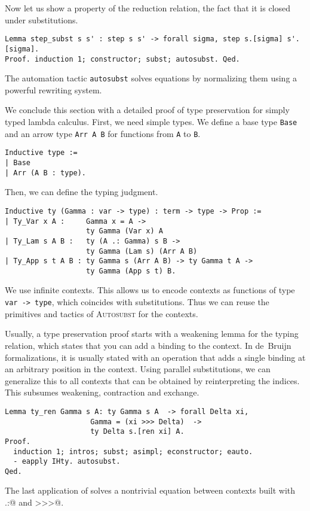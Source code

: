 \documentclass{scrartcl}
\newcommand{\Autosubst}{\textsc{Autosubst}\xspace}
\newcommand{\lst}{\lstinline}
\begin{document}
Now let us show a property of the reduction relation, the fact that it is closed under substitutions.
\begin{lstlisting}
Lemma step_subst s s' : step s s' -> forall sigma, step s.[sigma] s'.[sigma].
Proof. induction 1; constructor; subst; autosubst. Qed.
\end{lstlisting}
The automation tactic \lst$autosubst$ solves equations by normalizing them using a powerful rewriting system. 

We conclude this section with a detailed proof of type preservation for simply typed lambda calculus.
First, we need simple types. We define a base type \lst$Base$ and an arrow type \lst$Arr A B$ for functions from \lst$A$ to \lst$B$.
\begin{lstlisting}
Inductive type :=
| Base
| Arr (A B : type).
\end{lstlisting}
Then, we can define the typing judgment.
\begin{lstlisting}
Inductive ty (Gamma : var -> type) : term -> type -> Prop :=
| Ty_Var x A :     Gamma x = A -> 
                   ty Gamma (Var x) A
| Ty_Lam s A B :   ty (A .: Gamma) s B -> 
                   ty Gamma (Lam s) (Arr A B)
| Ty_App s t A B : ty Gamma s (Arr A B) -> ty Gamma t A -> 
                   ty Gamma (App s t) B.
\end{lstlisting}
We use infinite contexts. This allows us to encode contexts as functions of type \lst$var -> type$, which coincides with substitutions. Thus we can reuse the primitives and tactics of \Autosubst for the contexts.

Usually, a type preservation proof starts with a weakening lemma for the typing relation, which states that you can add a binding to the context. 
In de~Bruijn formalizations, it is usually stated with an operation that adds a single binding at an arbitrary position in the context.
Using parallel substitutions, we can generalize this to all contexts that can be obtained by reinterpreting the indices. This subsumes weakening, contraction and exchange.
\begin{lstlisting}
Lemma ty_ren Gamma s A: ty Gamma s A  -> forall Delta xi, 
                    Gamma = (xi >>> Delta)  ->
                    ty Delta s.[ren xi] A.
Proof.
  induction 1; intros; subst; asimpl; econstructor; eauto. 
  - eapply IHty. autosubst.
Qed.
\end{lstlisting}
The last application of \lst@autosubst@ solves a nontrivial equation between contexts built with \lst@.:@ and \lst@>>>@.
\end{document}
